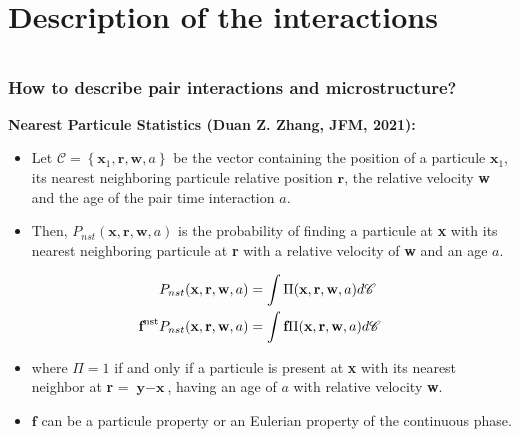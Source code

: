 \documentclass{sintefbeamer}
\begin{document}
\section{Description of the interactions}
\section*{}


\begin{frame}
  \frametitle{How to describe pair interactions and microstructure?}
  
  \textbf{Nearest Particule Statistics (Duan Z. Zhang, JFM, 2021): }
  \begin{definition}
    \begin{itemize}
      \item Let $\mathscr{C} =\left\{\textbf{x}_1, \textbf{r}, \textbf{w},a\right\}$ be the vector containing the position of a particule $\textbf{x}_1$, its nearest neighboring particule relative position $\textbf{r}$, the relative velocity \textbf{w} and the age of the pair time interaction $a$.
      \item Then, $P_{nst}(\textbf{x},\textbf{r},\textbf{w},a) $ is the probability of finding a particule at \textbf{x} with its nearest neighboring particule at \textbf{r} with a relative velocity of \textbf{w} and an age $a$. 
    \end{itemize}
  \end{definition}

  \begin{align*}
    P_{nst}(\textbf{x},\textbf{r},\textbf{w},a)
    &= \int \Pi(\textbf{x},\textbf{r},\textbf{w},a) d\mathscr{C}\\
    \textbf{f}^\text{nst} P_{nst}(\textbf{x},\textbf{r},\textbf{w},a)
    &= \int \textbf{f} \Pi(\textbf{x},\textbf{r},\textbf{w},a) d\mathscr{C}
  \end{align*}
  \begin{itemize}
    \item 
    where $\Pi = 1$ if and only if a particule is present at \textbf{x} with its nearest neighbor at \textbf{r} = $\textbf{y}-\textbf{x}$, having an age of $a$ with relative velocity \textbf{w}. 
    \item $\textbf{f}$ can be a particule property or an Eulerian property of the continuous phase. 
  \end{itemize}
\end{frame}
\end{document}
